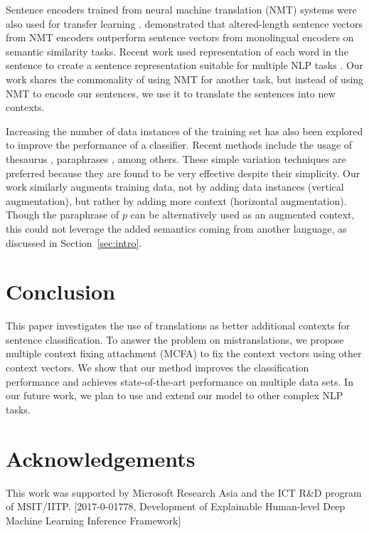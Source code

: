 \documentclass{article}
\begin{document}
Sentence encoders trained from neural machine translation (NMT) systems were also used for transfer learning \cite{hill2016learning}. 
\cite{hill2017representational} 
demonstrated that altered-length sentence vectors from NMT encoders outperform sentence vectors from monolingual encoders on semantic similarity tasks. Recent work used representation of each word in the sentence to create a sentence representation suitable for multiple NLP tasks \cite{mccann2017learned}.
Our work shares the commonality of using NMT for another task, but instead of using NMT to encode our sentences, we 
use it to translate the sentences into new contexts.




Increasing the number of data instances of the training set has also been explored to improve the performance of a classifier. 
Recent methods include the usage of thesaurus \cite{zhang2015character}, paraphrases \cite{fu2014improving}, among others.
These simple variation techniques are preferred because they are found to be very effective despite their simplicity.
Our work similarly augments training data, not by adding data instances (vertical augmentation), but rather by adding more context (horizontal augmentation). Though the paraphrase of $p$ can be alternatively used as an augmented context, this could not leverage the added semantics coming from another language, as discussed in Section~\ref{sec:intro}. 



\section{Conclusion}

This paper investigates the use of translations as better additional contexts for sentence classification. To answer the problem on mistranslations, we propose 
multiple context fixing attachment (MCFA) to fix the context vectors using other context vectors. We show that our method improves the classification performance and achieves state-of-the-art performance on multiple data sets. In our future work, we plan to use and extend our model to other complex NLP tasks.


\section*{Acknowledgements}

This work was supported by Microsoft Research Asia and the ICT R\&D program of MSIT/IITP.
[2017-0-01778, Development of Explainable Human-level Deep Machine Learning Inference Framework]



\end{document}
